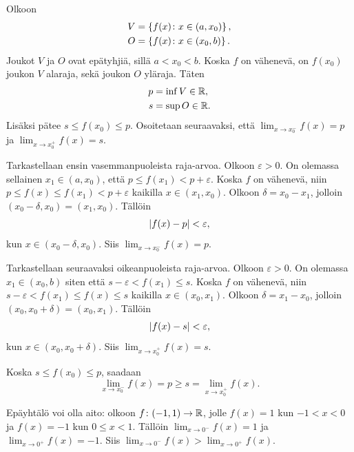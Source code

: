 \documentclass[11pt,a4paper]{amsart}
\begin{document}
\begin{solution}
  Olkoon
  \[
    \begin{aligned}
      V &= \left\lbrace f(x) \colon x \in (a, x_0)\right\rbrace, \\
      O &= \left\lbrace f(x) \colon x \in (x_0, b)\right\rbrace.
    \end{aligned}
  \]
  Joukot \(V\) ja \(O\) ovat epätyhjiä, sillä \(a < x_0 < b\).
  Koska \(f\) on vähenevä, on \(f(x_0)\) joukon \(V\) alaraja, sekä joukon
  \(O\) yläraja. Täten
  \[
    \begin{aligned}
      p &= \inf{V} \in \mathbb{R}, \\
      s &= \sup{O} \in \mathbb{R}.
    \end{aligned}
  \]
  Lisäksi pätee \(s \leq f(x_0) \leq p\). Osoitetaan seuraavaksi, että
  \(\lim_{x \to x_0^-} f(x) = p\) ja \(\lim_{x \to x_0^+} f(x) = s\).

  Tarkastellaan ensin vasemmanpuoleista raja-arvoa. Olkoon
  \(\varepsilon > 0\). On olemassa sellainen \(x_1 \in (a, x_0)\),
  että \(p \leq f(x_1) < p + \varepsilon\). Koska \(f\) on vähenevä,
  niin \(p \leq f(x) \leq f(x_1) < p + \varepsilon\) kaikilla \(x \in
  (x_1, x_0)\). Olkoon \(\delta = x_0 - x_1\), jolloin \((x_0 -
  \delta, x_0) = (x_1, x_0)\). Tällöin
  \[
    \lvert f(x) - p\rvert < \varepsilon,
  \]
  kun \(x \in (x_0 - \delta, x_0)\). Siis \(\lim_{x \to x_0^-} f(x) = p\).

  Tarkastellaan seuraavaksi oikeanpuoleista raja-arvoa. Olkoon
  \(\varepsilon > 0\). On olemassa \(x_1 \in (x_0, b)\) siten että
  \(s - \varepsilon < f(x_1) \leq s\). Koska \(f\) on vähenevä, niin
  \(s - \varepsilon < f(x_1) \leq f(x) \leq s\) kaikilla \(x \in (x_0, x_1)\).
  Olkoon \(\delta = x_1 - x_0\), jolloin \((x_0, x_0 + \delta) = (x_0, x_1)\).
  Tällöin
  \[
    \lvert f(x) - s\rvert < \varepsilon,
  \]
  kun \(x \in (x_0, x_0 + \delta)\). Siis \(\lim_{x \to x_0^+} f(x) = s\).

  Koska \(s \leq f(x_0) \leq p\), saadaan
  \[
    \lim_{x \to x_0^-} f(x) = p \geq s = \lim_{x \to x_0^+} f(x).
  \]

  Epäyhtälö voi olla aito: olkoon \(f \colon (-1, 1) \to \mathbb{R}\), jolle
  \(f(x) = 1\) kun \(-1 < x < 0\) ja \(f(x) = -1\) kun \(0 \leq x < 1\). Tällöin
  \(\lim_{x \to 0^-} f(x) = 1\) ja \(\lim_{x \to 0^+} f(x) = -1\).
  Siis \(\lim_{x \to 0^-} f(x) > \lim_{x \to 0^+} f(x)\).
\end{solution}
\end{document}

